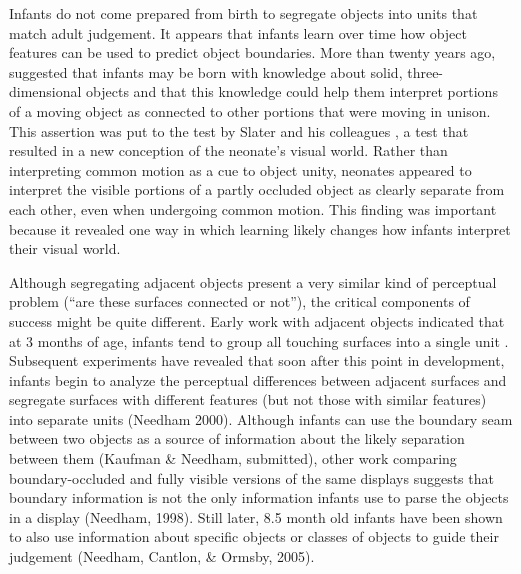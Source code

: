 Infants do not come prepared from birth to segregate objects into 
units that match adult judgement.
%
%
It appears that infants learn over time how object
features can be used to predict object boundaries.  More than twenty
years ago,  suggested that infants may be born
with knowledge about solid, three-dimensional objects and that this
knowledge could help them interpret portions of a moving object as
connected to other portions that were moving in unison.  This
assertion was put to the test by Slater and his colleagues 
\cite{slater90newborn}, a test that resulted in a new conception of
the neonate's visual world.  Rather than interpreting common motion as
a cue to object unity, neonates appeared to interpret the visible portions of a
partly occluded object as clearly separate from each other, even when
undergoing common motion.  This finding was important because it
revealed one way in which learning likely changes how infants
interpret their visual world.


Although segregating adjacent objects present a very similar kind of
perceptual problem (``are these surfaces connected or not''), the
critical components of success might be quite different.  Early work
with adjacent objects indicated that at 3 months of age, infants tend
to group all touching surfaces into a single unit
\cite{kestenbaum87perception}.  Subsequent experiments have revealed
that soon after this point in development, infants begin to analyze
the perceptual differences between adjacent surfaces and segregate
surfaces with different features (but not those with similar features)
into separate units (Needham 2000).
%
\ifverbose
Although infants can use the boundary seam between
two objects as a source of information about the likely separation
between them (Kaufman \& Needham, submitted), other work comparing
boundary-occluded and fully visible versions of the same displays
suggests that boundary information is not the only information infants
use to parse the objects in a display (Needham, 1998).  
\fi
%
Still later,
8.5 month old infants have been shown to also use information about specific
objects or classes of objects to guide their judgement (Needham,
Cantlon, \& Ormsby, 2005).



